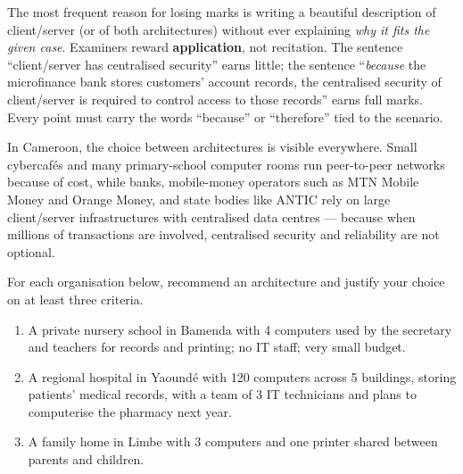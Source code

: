 \documentclass[11pt]{article}
\begin{document}
\begin{attention}
The most frequent reason for losing marks is writing a beautiful description of client/server (or of both architectures) without ever explaining \emph{why it fits the given case}. Examiners reward \textbf{application}, not recitation. The sentence ``client/server has centralised security'' earns little; the sentence ``\emph{because} the microfinance bank stores customers' account records, the centralised security of client/server is required to control access to those records'' earns full marks. Every point must carry the words ``because'' or ``therefore'' tied to the scenario.
\end{attention}

\begin{savaistu}
In Cameroon, the choice between architectures is visible everywhere. Small cybercafés and many primary-school computer rooms run peer-to-peer networks because of cost, while banks, mobile-money operators such as MTN Mobile Money and Orange Money, and state bodies like ANTIC rely on large client/server infrastructures with centralised data centres — because when millions of transactions are involved, centralised security and reliability are not optional.
\end{savaistu}

\begin{exercice}
For each organisation below, recommend an architecture and justify your choice on at least three criteria.
\begin{enumerate}
\item A private nursery school in Bamenda with 4 computers used by the secretary and teachers for records and printing; no IT staff; very small budget.
\item A regional hospital in Yaoundé with 120 computers across 5 buildings, storing patients' medical records, with a team of 3 IT technicians and plans to computerise the pharmacy next year.
\item A family home in Limbe with 3 computers and one printer shared between parents and children.
\end{enumerate}
\end{exercice}
\end{document}
